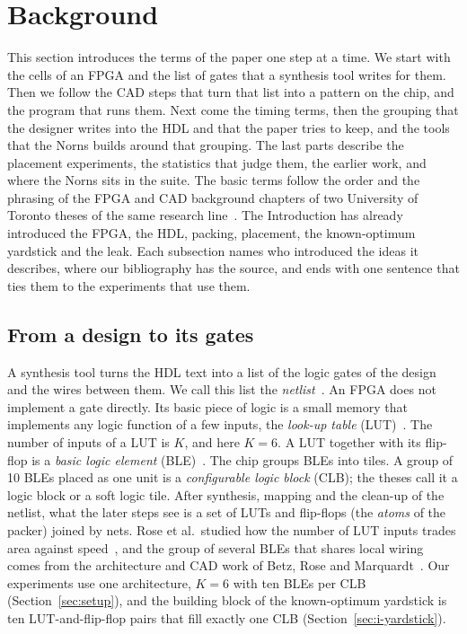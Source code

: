 \section{Background}
\label{sec:background}

This section introduces the terms of the paper one step at a time. We start with the cells of an FPGA and the list of gates that a synthesis tool writes for them. Then we follow the CAD steps that turn that list into a pattern on the chip, and the program that runs them. Next come the timing terms, then the grouping that the designer writes into the HDL and that the paper tries to keep, and the tools that the Norns builds around that grouping. The last parts describe the placement experiments, the statistics that judge them, the earlier work, and where the Norns sits in the suite. The basic terms follow the order and the phrasing of the FPGA and CAD background chapters of two University of Toronto theses of the same research line~\cite{jamiesonthesis,luu2014thesis}. The Introduction has already introduced the FPGA, the HDL, packing, placement, the known-optimum yardstick and the leak. Each subsection names who introduced the ideas it describes, where our bibliography has the source, and ends with one sentence that ties them to the experiments that use them.

\subsection{From a design to its gates}

A synthesis tool turns the HDL text into a list of the logic gates of the design and the wires between them. We call this list the \emph{netlist}~\cite{jamiesonthesis}. %
An FPGA does not implement a gate directly. Its basic piece of logic is a small memory that implements any logic function of a few inputs, the \emph{look-up table} (LUT)~\cite{jamiesonthesis,luu2014thesis}. %
The number of inputs of a LUT is $K$, and here \emph{$K=6$}. %
A LUT together with its flip-flop is a \emph{basic logic element} (BLE)~\cite{jamiesonthesis,luu2014thesis}. %
The chip groups BLEs into tiles. A group of 10 BLEs placed as one unit is a \emph{configurable logic block} (CLB); the theses call it a logic block or a soft logic tile. %
After synthesis, mapping and the clean-up of the netlist, what the later steps see is a set of LUTs and flip-flops (the \emph{atoms} of the packer) joined by nets. Rose et al.\ studied how the number of LUT inputs trades area against speed~\cite{Rose90lut}, and the group of several BLEs that shares local wiring comes from the architecture and CAD work of Betz, Rose and Marquardt~\cite{betz99purple_book}. Our experiments use one architecture, $K=6$ with ten BLEs per CLB (Section~\ref{sec:setup}), and the building block of the known-optimum yardstick is ten LUT-and-flip-flop pairs that fill exactly one CLB (Section~\ref{sec:i-yardstick}).

